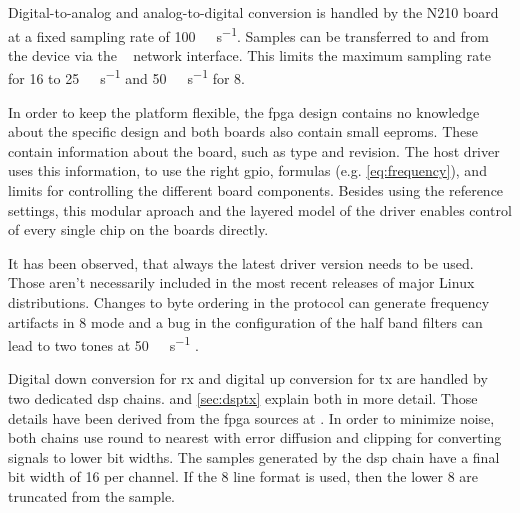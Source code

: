 \documentclass[12pt,a4paper,parskip=full]{scrartcl}
\begin{document}
Digital-to-analog and analog-to-digital conversion is handled by the N210 board at a fixed sampling rate of
\SI{100}{\mega\samples\per\second}. Samples can be transferred to and from the device via the
\si{\giga\bit} network interface. This limits the maximum sampling rate for \SI{16}{\bit} to
\SI{25}{\mega\samples\per\second} and \SI{50}{\mega\samples\per\second} for \SI{8}{\bit}.

In order to keep the platform flexible, the \gls{fpga} design contains no knowledge
about the specific design and both boards also contain small \glspl{eeprom}. These contain
information about the board, such as type and revision. The host driver uses this information,
to use the right \gls{gpio}, formulas (e.g. \cref{eq:frequency}), and limits for controlling
the different board components. Besides using the reference settings, this modular aproach
and the layered model of the driver enables control of every single chip on the boards directly.

It has been observed, that always the latest driver version needs to be used. Those aren't
necessarily included in the most recent releases of major Linux distributions. Changes to
byte ordering in the protocol \cite{usrp_byte} can
generate frequency artifacts in \SI{8}{\bit} mode and a bug in the configuration of the half
band filters can lead to two tones at \SI{50}{\mega\samples\per\second} \cite{usrp_hb}.

Digital down conversion for \gls{rx} and digital up conversion for \gls{tx} are handled
by two dedicated \gls{dsp} chains.
 and \cref{sec:dsptx} explain both in more detail. Those details have been derived
from the \gls{fpga} sources at \cite{usrp_src}.
In order to minimize noise, both chains use round to nearest with error diffusion and clipping
for converting signals to lower bit widths. The samples generated by the dsp chain have a final
bit width of \SI{16}{\bit} per channel. If the \SI{8}{\bit} line format is used, then the
lower \SI{8}{\bit} are truncated from the sample.
\end{document}
